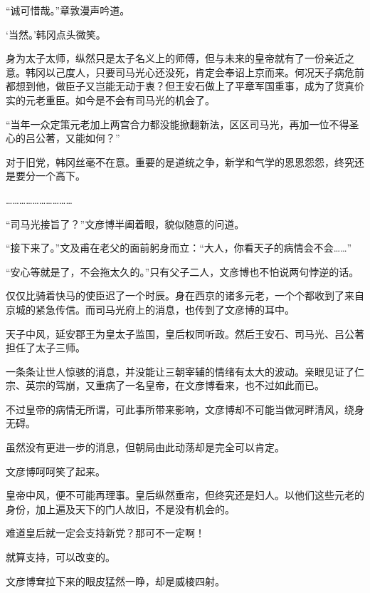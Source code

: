 “诚可惜哉。”章敦漫声吟道。

‘当然。’韩冈点头微笑。

身为太子太师，纵然只是太子名义上的师傅，但与未来的皇帝就有了一份亲近之意。韩冈以己度人，只要司马光心还没死，肯定会奉诏上京而来。何况天子病危前都想到他，做臣子又岂能无动于衷？但王安石做上了平章军国重事，成为了货真价实的元老重臣。如今是不会有司马光的机会了。

“当年一众定策元老加上两宫合力都没能掀翻新法，区区司马光，再加一位不得圣心的吕公著，又能如何？”

对于旧党，韩冈丝毫不在意。重要的是道统之争，新学和气学的恩恩怨怨，终究还是要分一个高下。

…………………………

“司马光接旨了？”文彦博半阖着眼，貌似随意的问道。

“接下来了。”文及甫在老父的面前躬身而立：“大人，你看天子的病情会不会……”

“安心等就是了，不会拖太久的。”只有父子二人，文彦博也不怕说两句悖逆的话。

仅仅比骑着快马的使臣迟了一个时辰。身在西京的诸多元老，一个个都收到了来自京城的紧急传信。而司马光府上的消息，也传到了文彦博的耳中。

天子中风，延安郡王为皇太子监国，皇后权同听政。然后王安石、司马光、吕公著担任了太子三师。

一条条让世人惊骇的消息，并没能让三朝宰辅的情绪有太大的波动。亲眼见证了仁宗、英宗的驾崩，又重病了一名皇帝，在文彦博看来，也不过如此而已。

不过皇帝的病情无所谓，可此事所带来影响，文彦博却不可能当做河畔清风，绕身无碍。

虽然没有更进一步的消息，但朝局由此动荡却是完全可以肯定。

文彦博呵呵笑了起来。

皇帝中风，便不可能再理事。皇后纵然垂帘，但终究还是妇人。以他们这些元老的身份，加上遍及天下的门人故旧，不是没有机会的。

难道皇后就一定会支持新党？那可不一定啊！

就算支持，可以改变的。

文彦博耷拉下来的眼皮猛然一睁，却是威棱四射。

